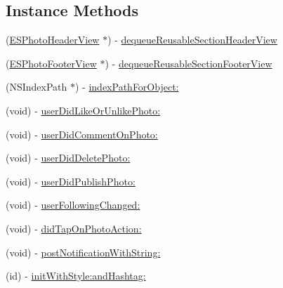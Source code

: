 \subsection*{Instance Methods}
\begin{DoxyCompactItemize}
\item 
(\hyperlink{interface_e_s_photo_header_view}{E\+S\+Photo\+Header\+View} $\ast$) -\/ \hyperlink{interface_e_s_hashtag_timeline_view_controller_a68076ab8db291ab694ba52425614638c}{dequeue\+Reusable\+Section\+Header\+View}
\item 
(\hyperlink{interface_e_s_photo_footer_view}{E\+S\+Photo\+Footer\+View} $\ast$) -\/ \hyperlink{interface_e_s_hashtag_timeline_view_controller_ad9ef0fee515e360a168bd8e29740021b}{dequeue\+Reusable\+Section\+Footer\+View}
\item 
(N\+S\+Index\+Path $\ast$) -\/ \hyperlink{interface_e_s_hashtag_timeline_view_controller_a1093e1e8eedfe3961d35653580a833fc}{index\+Path\+For\+Object\+:}
\item 
(void) -\/ \hyperlink{interface_e_s_hashtag_timeline_view_controller_acef7a088f364c0f443402b289bd2d4b6}{user\+Did\+Like\+Or\+Unlike\+Photo\+:}
\item 
(void) -\/ \hyperlink{interface_e_s_hashtag_timeline_view_controller_a2230ff1ecaa0957b8dfcf28cab72b086}{user\+Did\+Comment\+On\+Photo\+:}
\item 
(void) -\/ \hyperlink{interface_e_s_hashtag_timeline_view_controller_ae07973cc0efbcfac5bea03d7abb2aa64}{user\+Did\+Delete\+Photo\+:}
\item 
(void) -\/ \hyperlink{interface_e_s_hashtag_timeline_view_controller_a51b9340d589bb26bc5f561823ab68b71}{user\+Did\+Publish\+Photo\+:}
\item 
(void) -\/ \hyperlink{interface_e_s_hashtag_timeline_view_controller_a8f583b8aebe9509b6dfa803bac89fbcc}{user\+Following\+Changed\+:}
\item 
(void) -\/ \hyperlink{interface_e_s_hashtag_timeline_view_controller_a33461855f822dc799941679a27e26f24}{did\+Tap\+On\+Photo\+Action\+:}
\item 
(void) -\/ \hyperlink{interface_e_s_hashtag_timeline_view_controller_a17e5c80c47efdf196b1a8f18aaf086cb}{post\+Notification\+With\+String\+:}
\item 
(id) -\/ \hyperlink{interface_e_s_hashtag_timeline_view_controller_a348761f775af9828a43afaa8e21f567b}{init\+With\+Style\+:and\+Hashtag\+:}
\end{DoxyCompactItemize}
